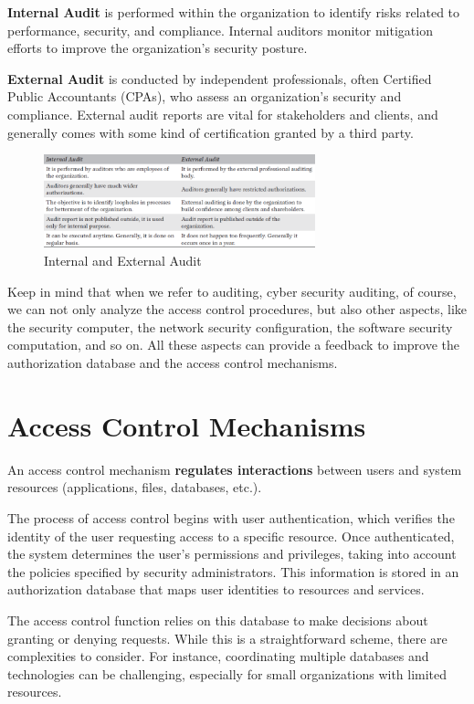 \textbf{Internal Audit} is performed within the organization to identify risks
related to performance, security, and compliance. Internal auditors monitor
mitigation efforts to improve the organization’s security posture.

\textbf{External Audit} is conducted by independent professionals, often
Certified Public Accountants (CPAs), who assess an organization's security and
compliance. External audit reports are vital for stakeholders and
clients, and generally comes with some kind of certification granted
by a third party.

\begin{figure}[h]
  \centering
  \includegraphics[width=0.7\textwidth]{img/internal-external-audit.png}
  \caption{Internal and External Audit}
\end{figure}

Keep in mind that when we refer to auditing, cyber security auditing,
of course, we can not only analyze the access control procedures, but
also other aspects, like the security computer, the network security
configuration, the software security computation, and so on. All these 
aspects can provide a feedback to improve the authorization database 
and the access control mechanisms.

\section{Access Control Mechanisms}
\begin{boxH}
  An access control mechanism \textbf{regulates interactions} between
  users and system resources (applications, files, databases, etc.).
\end{boxH}

The process of access control begins with user authentication, which
verifies the identity of the user requesting access to a specific
resource. Once authenticated, the system determines the user's
permissions and privileges, taking into account the policies specified
by security administrators. This information is stored in an
authorization database that maps user identities to resources and
services.

The access control function relies on this database to make decisions
about granting or denying requests. While this is a straightforward
scheme, there are complexities to consider. For instance, coordinating
multiple databases and technologies can be challenging, especially for
small organizations with limited resources.

